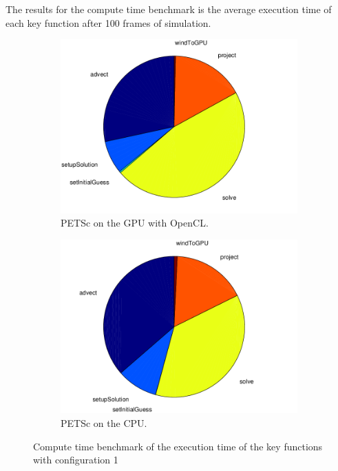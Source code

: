 The results for the compute time benchmark is the average execution time of each
key function after 100 frames of simulation.

\begin{figure}[ht]
	\center
	
	\begin{subfigure}{0.45\textwidth}
		\center
		\includegraphics[width=1.0\textwidth]{results/data/td/td_conf1_petsc_gpu}
		\caption{PETSc on the GPU with OpenCL.}
		\label{fig:td_conf1_petsc_gpu}
	\end{subfigure}
	\begin{subfigure}{0.45\textwidth}
		\center
		\includegraphics[width=1.0\textwidth]{results/data/td/td_conf1_petsc_cpu}
		\caption{PETSc on the CPU.}
		\label{fig:td_conf1_petsc_cpu}
	\end{subfigure}
	\caption{Compute time benchmark of the execution time of the key functions
			with configuration 1}
	\label{fig:td_conf1}
	
\end{figure}

